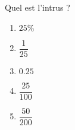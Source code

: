 
\begin{mental}
Quel est l'intrus ?
\begin{multicols}{2}
\begin{enumerate}
    \item
        \( 25\%\)
    \item
        \( \dfrac{1}{ 25 }\)
    \item
        \( 0.25\)
    \item
        \( \dfrac{ 25 }{ 100 }\)
    \item
        \( \dfrac{ 50 }{ 200 }\)
\end{enumerate}
\end{multicols}
\end{mental}
